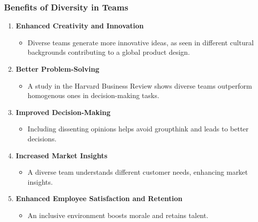 \documentclass[aspectratio=169]{beamer}
\begin{document}
\begin{frame}[fragile]
    \frametitle{Benefits of Diversity in Teams}
    \begin{enumerate}
        \item \textbf{Enhanced Creativity and Innovation}
            \begin{itemize}
                \item Diverse teams generate more innovative ideas, as seen in different cultural backgrounds contributing to a global product design.
            \end{itemize}
        \item \textbf{Better Problem-Solving}
            \begin{itemize}
                \item A study in the Harvard Business Review shows diverse teams outperform homogenous ones in decision-making tasks.
            \end{itemize}
        \item \textbf{Improved Decision-Making}
            \begin{itemize}
                \item Including dissenting opinions helps avoid groupthink and leads to better decisions.
            \end{itemize}
        \item \textbf{Increased Market Insights}
            \begin{itemize}
                \item A diverse team understands different customer needs, enhancing market insights.
            \end{itemize}
        \item \textbf{Enhanced Employee Satisfaction and Retention}
            \begin{itemize}
                \item An inclusive environment boosts morale and retains talent.
            \end{itemize}
    \end{enumerate}
\end{frame}
\end{document}
